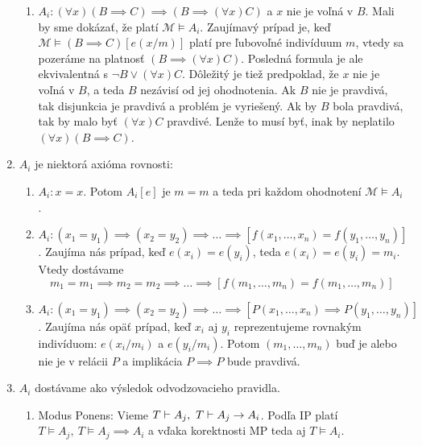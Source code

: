 \begin{dokaz}
\begin{enumerate}
\begin{enumerate}
        \item $A_i: (\forall x) (B \implies C) \implies (B \implies
            (\forall x) C)$ a $x$ nie je voľná v $B$.
            Mali by sme dokázať, že platí $\mathcal{M} \models A_i$.
            Zaujímavý prípad je, keď
            $\mathcal{M} \models (B \implies C)[e(x/m)]$ platí pre
            ľubovoľné indivíduum $m$, vtedy sa
            pozeráme na platnosť $(B \implies (\forall x)C)$.
            Posledná formula je ale ekvivalentná s $\neg B \lor (\forall x) C$.
            Dôležitý je tiež predpoklad, že $x$ nie je voľná v $B$,
            a teda $B$ nezávisí od jej ohodnotenia.
            Ak $B$ nie je pravdivá, tak disjunkcia je pravdivá a
            problém je vyriešený.
            Ak by $B$ bola pravdivá, tak by malo byť $(\forall x) C$
            pravdivé. Lenže to musí byť, inak by neplatilo
            $(\forall x) (B \implies C)$.
    \end{enumerate}

    \item $A_i$ je niektorá axióma rovnosti:
    \begin{enumerate}
        \item $A_i: x=x$. Potom $A_i[e]$ je $m=m$ a teda pri každom
            ohodnotení $\mathcal{M} \models A_i$.

        \item $A_i: (x_1 = y_1) \implies (x_2 = y_2) \implies \ldots 
            \implies [f(x_1, \ldots, x_n) = f(y_1, \ldots, y_n)]$.
            Zaujíma nás prípad, keď  $e(x_i) = e(y_i)$, teda
            $e(x_i)=e(y_i)=m_i$. Vtedy dostávame
            \begin{equation*}
              m_1=m_1 \implies m_2=m_2 \implies \ldots
                \implies [f(m_1, \dots, m_n) =f(m_1, \dots, m_n)]
            \end{equation*}

        \item $A_i: (x_1 = y_1) \implies (x_2 = y_2) \implies \ldots 
            \implies [P(x_1, \ldots, x_n) \implies P(y_1, \ldots, y_n)]$.
            Zaujíma nás opäť prípad, keď $x_i$ aj $y_i$ reprezentujeme 
            rovnakým indivíduom: $e(x_i/m_i)$ a $e(y_i/m_i)$.
            Potom $(m_1,\dots,m_n)$ buď je alebo nie je v relácii $P$
            a implikácia $P \implies P$ bude pravdivá.
    \end{enumerate}

    \item $A_i$ dostávame ako výsledok odvodzovacieho pravidla.
        \begin{enumerate}
        \item Modus Ponens:
            Vieme
            $T \provable A_j,\ T \provable A_j \implies A_i$.
            Podľa IP platí
            $T \models A_j,\ T \models A_j \implies A_i$ a vďaka
            korektnosti MP teda aj $T \models A_i$.


\end{enumerate}
\end{enumerate}
\end{dokaz}
